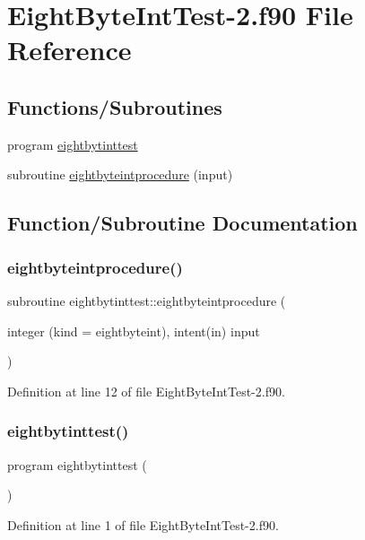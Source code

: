 \hypertarget{EightByteIntTest-2_8f90}{}\section{Eight\+Byte\+Int\+Test-\/2.f90 File Reference}
\label{EightByteIntTest-2_8f90}
\subsection*{Functions/\+Subroutines}
\begin{DoxyCompactItemize}
\item 
program \hyperlink{EightByteIntTest-2_8f90_a68b454a0650f1f618a0189e4a610c644}{eightbytinttest}
\item 
subroutine \hyperlink{EightByteIntTest-2_8f90_a737105c1cdb4fd260a16810007c76741}{eightbyteintprocedure} (input)
\end{DoxyCompactItemize}


\subsection{Function/\+Subroutine Documentation}
\mbox{\label{EightByteIntTest-2_8f90_a737105c1cdb4fd260a16810007c76741}} 
\subsubsection{\texorpdfstring{eightbyteintprocedure()}{eightbyteintprocedure()}}
{\footnotesize\ttfamily subroutine eightbytinttest\+::eightbyteintprocedure (\begin{DoxyParamCaption}\item[{integer (kind = eightbyteint), intent(in)}]{input }\end{DoxyParamCaption})}



Definition at line 12 of file Eight\+Byte\+Int\+Test-\/2.\+f90.

\mbox{\label{EightByteIntTest-2_8f90_a68b454a0650f1f618a0189e4a610c644}} 
\subsubsection{\texorpdfstring{eightbytinttest()}{eightbytinttest()}}
{\footnotesize\ttfamily program eightbytinttest (\begin{DoxyParamCaption}{ }\end{DoxyParamCaption})}



Definition at line 1 of file Eight\+Byte\+Int\+Test-\/2.\+f90.

